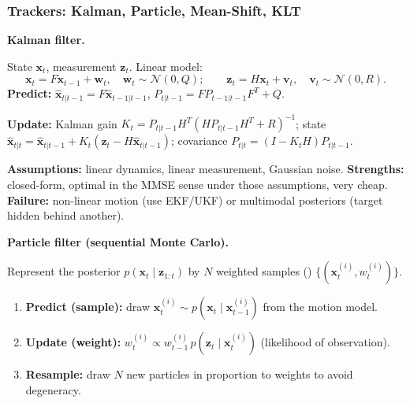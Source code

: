 \bigseparator

\subsubsection{Trackers: Kalman, Particle, Mean-Shift, KLT}

\textbf{Kalman filter.}

\begin{thmbox}
State $\mathbf{x}_t$, measurement $\mathbf{z}_t$. Linear model:
\[
\mathbf{x}_t = F \mathbf{x}_{t-1} + \mathbf{w}_t, \quad \mathbf{w}_t \sim \mathcal{N}(0, Q); \qquad \mathbf{z}_t = H \mathbf{x}_t + \mathbf{v}_t, \quad \mathbf{v}_t \sim \mathcal{N}(0, R).
\]
\textbf{Predict:} $\hat{\mathbf{x}}_{t|t-1} = F \hat{\mathbf{x}}_{t-1|t-1}$, $P_{t|t-1} = F P_{t-1|t-1} F^T + Q$.

\textbf{Update:} Kalman gain $K_t = P_{t|t-1} H^T (H P_{t|t-1} H^T + R)^{-1}$; state $\hat{\mathbf{x}}_{t|t} = \hat{\mathbf{x}}_{t|t-1} + K_t (\mathbf{z}_t - H \hat{\mathbf{x}}_{t|t-1})$; covariance $P_{t|t} = (I - K_t H) P_{t|t-1}$.
\end{thmbox}

\textbf{Assumptions:} linear dynamics, linear measurement, Gaussian noise. \textbf{Strengths:} closed-form, optimal in the MMSE sense under those assumptions, very cheap. \textbf{Failure:} non-linear motion (use EKF/UKF) or multimodal posteriors (target hidden behind another).

\textbf{Particle filter (sequential Monte Carlo).}

\begin{thmbox}
Represent the posterior $p(\mathbf{x}_t \mid \mathbf{z}_{1:t})$ by $N$ weighted samples () $\{(\mathbf{x}_t^{(i)}, w_t^{(i)})\}$.
\begin{enumerate}
  \item \textbf{Predict (sample):} draw $\mathbf{x}_t^{(i)} \sim p(\mathbf{x}_t \mid \mathbf{x}_{t-1}^{(i)})$ from the motion model.
  \item \textbf{Update (weight):} $w_t^{(i)} \propto w_{t-1}^{(i)} \, p(\mathbf{z}_t \mid \mathbf{x}_t^{(i)})$ (likelihood of observation).
  \item \textbf{Resample:} draw $N$ new particles in proportion to weights to avoid degeneracy.
\end{enumerate}
\end{thmbox}

